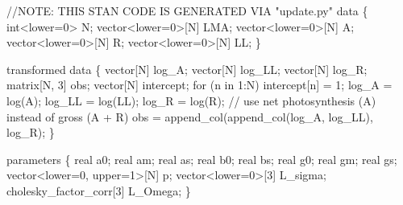 \documentclass[
  12pt,
  letterpaper,
  DIV=11,
  numbers=noendperiod]{scrartcl}
\newenvironment{Shaded}{\begin{snugshade}}{\end{snugshade}}
\newcommand{\AlertTok}[1]{\textcolor[rgb]{0.68,0.00,0.00}{#1}}
\newcommand{\CommentTok}[1]{\textcolor[rgb]{0.37,0.37,0.37}{#1}}
\newcommand{\ControlFlowTok}[1]{\textcolor[rgb]{0.00,0.23,0.31}{#1}}
\newcommand{\DataTypeTok}[1]{\textcolor[rgb]{0.68,0.00,0.00}{#1}}
\newcommand{\DecValTok}[1]{\textcolor[rgb]{0.68,0.00,0.00}{#1}}
\newcommand{\KeywordTok}[1]{\textcolor[rgb]{0.00,0.23,0.31}{#1}}
\newcommand{\NormalTok}[1]{\textcolor[rgb]{0.00,0.23,0.31}{#1}}
\begin{document}
\begin{Shaded}
\begin{Highlighting}[]
\CommentTok{//}\AlertTok{NOTE}\CommentTok{: THIS STAN CODE IS GENERATED VIA "update.py"}
\KeywordTok{data}\NormalTok{ \{}
  \DataTypeTok{int}\NormalTok{\textless{}}\KeywordTok{lower}\NormalTok{=}\DecValTok{0}\NormalTok{\textgreater{} N;}
  \DataTypeTok{vector}\NormalTok{\textless{}}\KeywordTok{lower}\NormalTok{=}\DecValTok{0}\NormalTok{\textgreater{}[N] LMA;}
  \DataTypeTok{vector}\NormalTok{\textless{}}\KeywordTok{lower}\NormalTok{=}\DecValTok{0}\NormalTok{\textgreater{}[N] A;}
  \DataTypeTok{vector}\NormalTok{\textless{}}\KeywordTok{lower}\NormalTok{=}\DecValTok{0}\NormalTok{\textgreater{}[N] R;}
  \DataTypeTok{vector}\NormalTok{\textless{}}\KeywordTok{lower}\NormalTok{=}\DecValTok{0}\NormalTok{\textgreater{}[N] LL;}
\NormalTok{\}}

\KeywordTok{transformed data}\NormalTok{ \{}
  \DataTypeTok{vector}\NormalTok{[N] log\_A;}
  \DataTypeTok{vector}\NormalTok{[N] log\_LL;}
  \DataTypeTok{vector}\NormalTok{[N] log\_R;}
  \DataTypeTok{matrix}\NormalTok{[N, }\DecValTok{3}\NormalTok{] obs;}
  \DataTypeTok{vector}\NormalTok{[N] intercept;}
  \ControlFlowTok{for}\NormalTok{ (n }\ControlFlowTok{in} \DecValTok{1}\NormalTok{:N)}
\NormalTok{    intercept[n] = }\DecValTok{1}\NormalTok{;}
\NormalTok{  log\_A = log(A);}
\NormalTok{  log\_LL = log(LL);}
\NormalTok{  log\_R = log(R);}
  \CommentTok{// use net photosynthesis (A) instead of gross (A + R)}
\NormalTok{  obs = append\_col(append\_col(log\_A, log\_LL), log\_R);}
\NormalTok{\}}

\KeywordTok{parameters}\NormalTok{ \{}
  \DataTypeTok{real}\NormalTok{ a0;}
  \DataTypeTok{real}\NormalTok{ am;}
  \DataTypeTok{real}\NormalTok{ as;}
  \DataTypeTok{real}\NormalTok{ b0;}
  \DataTypeTok{real}\NormalTok{ bs;}
  \DataTypeTok{real}\NormalTok{ g0;}
  \DataTypeTok{real}\NormalTok{ gm;}
  \DataTypeTok{real}\NormalTok{ gs;}
  \DataTypeTok{vector}\NormalTok{\textless{}}\KeywordTok{lower}\NormalTok{=}\DecValTok{0}\NormalTok{, }\KeywordTok{upper}\NormalTok{=}\DecValTok{1}\NormalTok{\textgreater{}[N] p;}
  \DataTypeTok{vector}\NormalTok{\textless{}}\KeywordTok{lower}\NormalTok{=}\DecValTok{0}\NormalTok{\textgreater{}[}\DecValTok{3}\NormalTok{] L\_sigma;}
  \DataTypeTok{cholesky\_factor\_corr}\NormalTok{[}\DecValTok{3}\NormalTok{] L\_Omega;}
\NormalTok{\}}


\end{Highlighting}
\end{Shaded}
\end{document}
